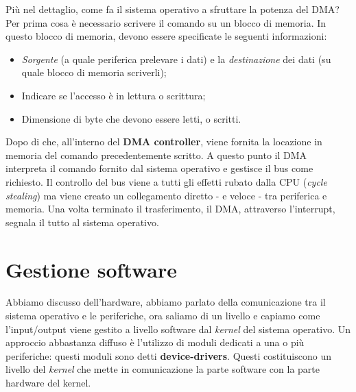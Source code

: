 Più nel dettaglio, come fa il sistema operativo a sfruttare la potenza del DMA? Per prima cosa è necessario scrivere il comando su un blocco di memoria. In questo blocco di memoria, devono essere specificate le seguenti informazioni:
\vspace{-5px}
\begin{itemize}
\setlength{\itemsep}{-.15 em}
    \item \textit{Sorgente} (a quale periferica prelevare i dati) e la \textit{destinazione} dei dati (su quale blocco di memoria scriverli);
    \item Indicare se l'accesso è in lettura o scrittura;
    \item Dimensione di byte che devono essere letti, o scritti.
\end{itemize}
Dopo di che, all'interno del \textbf{DMA controller}, viene fornita la locazione in memoria del comando precedentemente scritto. A questo punto il DMA interpreta il comando fornito dal sistema operativo e gestisce il bus come richiesto. Il controllo del bus viene a tutti gli effetti rubato dalla CPU (\textit{cycle stealing}) ma viene creato un collegamento diretto - e veloce - tra periferica e memoria. Una volta terminato il trasferimento, il DMA, attraverso l'interrupt, segnala il tutto al sistema operativo.

% 
\section{Gestione software}\label{device-drivers}
Abbiamo discusso dell'hardware, abbiamo parlato della comunicazione tra il sistema operativo e le periferiche, ora saliamo di un livello e capiamo come l'input/output viene gestito a livello software dal \textit{kernel} del sistema operativo. Un approccio abbastanza diffuso è l'utilizzo di moduli dedicati a una o più periferiche: questi moduli sono detti \textbf{device-drivers}. Questi costituiscono un livello del \textit{kernel} che mette in comunicazione la parte software con la parte hardware del kernel. 

